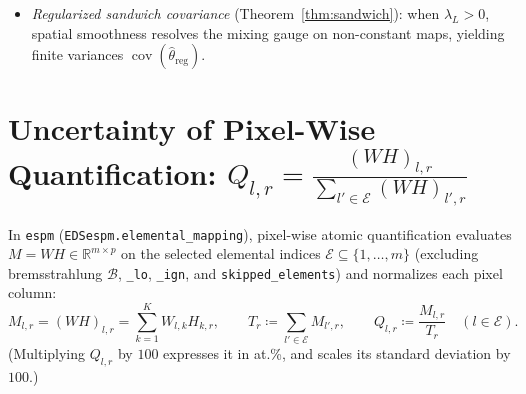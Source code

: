 \documentclass[11pt,a4paper]{article}
\theoremstyle{plain}
\theoremstyle{definition}
\theoremstyle{remark}
\newcommand{\R}{\mathbb{R}}
\newcommand{\E}{\mathcal{E}}
\newcommand{\B}{\mathcal{B}}
\newcommand{\cov}{\operatorname{cov}}
\begin{document}
\begin{enumerate}[leftmargin=1.5em]
\begin{itemize}[leftmargin=1.2em]
        \item \emph{Regularized sandwich covariance} (Theorem~\ref{thm:sandwich}): when $\lambda_L > 0$, spatial smoothness resolves the mixing gauge on non-constant maps, yielding finite variances $\cov(\hat{\theta}_{\text{reg}})$.
    \end{itemize}
\end{enumerate}

\section{Uncertainty of Pixel-Wise Quantification: \texorpdfstring{$Q_{l,r} = \frac{(WH)_{l,r}}{\sum_{l'\in\E} (WH)_{l',r}}$}{Q\_\{l,r\} = (WH)\_\{l,r\} / sum\_l (WH)\_\{l,r\}}}

In \texttt{espm} (\texttt{EDSespm.elemental\_mapping}), pixel-wise atomic quantification evaluates $M = WH \in \R^{m \times p}$ on the selected elemental indices $\E \subseteq \{1,\dots,m\}$ (excluding bremsstrahlung $\B$, \texttt{\_lo}, \texttt{\_ign}, and \texttt{skipped\_elements}) and normalizes each pixel column:
\begin{equation}
\label{eq:Q_def}
M_{l,r} = (WH)_{l,r} = \sum_{k=1}^K W_{l,k} H_{k,r}, \qquad T_r \coloneqq \sum_{l' \in \E} M_{l', r}, \qquad Q_{l,r} \coloneqq \frac{M_{l,r}}{T_r} \quad (l \in \E).
\end{equation}
(Multiplying $Q_{l,r}$ by $100$ expresses it in at.\%, and scales its standard deviation by $100$.)
\end{document}
